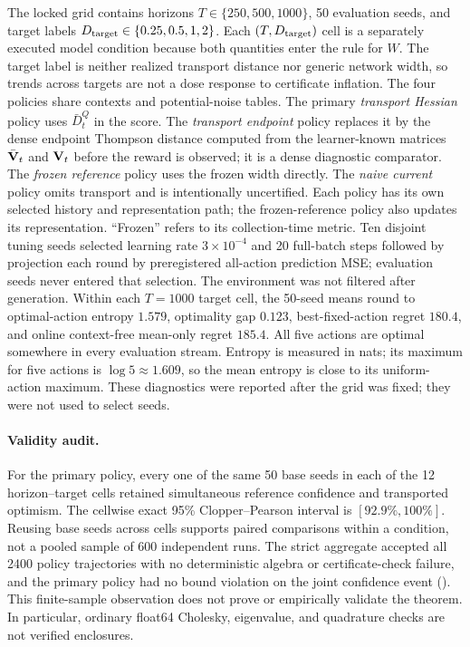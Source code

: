 The locked grid contains horizons $T\in\{250,500,1000\}$, 50 evaluation seeds,
and target labels $D_{\rm target}\in\{0.25,0.5,1,2\}$.  Each $(T,D_{\rm
target})$ cell is a separately executed model condition because both quantities
enter the rule for $W$.  The target label is neither realized transport distance
nor generic network width, so trends across targets are not a dose response to
certificate inflation.  The four policies share contexts and potential-noise tables.
The primary \emph{transport Hessian} policy uses $\bar D_t^Q$ in the score.  The
\emph{transport endpoint} policy replaces it by the dense endpoint Thompson
distance computed from the learner-known matrices $\bar{\mathbf{V}}_t$ and $\mathbf{V}_t$ before
the reward is observed; it is a dense diagnostic comparator.  The \emph{frozen
reference} policy uses the frozen width directly.  The \emph{naive current}
policy omits transport and is intentionally uncertified.  Each policy has its
own selected history and representation path; the frozen-reference policy also
updates its representation.  ``Frozen'' refers to its collection-time metric.
Ten disjoint tuning seeds
selected learning rate $3\times10^{-4}$ and 20 full-batch steps followed by
projection each round by preregistered all-action prediction MSE; evaluation
seeds never entered that selection.
The environment was not filtered after generation.  Within each $T=1000$
target cell, the 50-seed means round to optimal-action entropy $1.579$, optimality
gap $0.123$, best-fixed-action regret $180.4$, and online context-free
mean-only regret $185.4$.  All five actions are optimal somewhere in every
evaluation stream.  Entropy is measured in nats; its maximum for five actions
is $\log 5\approx1.609$, so the mean entropy is close to its uniform-action
maximum.  These diagnostics were reported after the grid was fixed;
they were not used to select seeds.

\paragraph{Validity audit.}
For the primary policy, every one of the same 50 base seeds in each of the 12
horizon--target cells retained simultaneous reference confidence and
transported optimism.  The cellwise exact 95\% Clopper--Pearson interval is
$[92.9\%,100\%]$.  Reusing base seeds across cells supports paired comparisons
within a condition, not a pooled sample of 600 independent runs.  The strict aggregate accepted all 2400 policy
trajectories with no deterministic algebra or certificate-check failure, and
the primary policy had no bound violation on the joint confidence event
().  This finite-sample observation
does not prove or empirically validate the theorem.  In particular, ordinary
float64 Cholesky, eigenvalue, and quadrature checks are not verified
enclosures.

